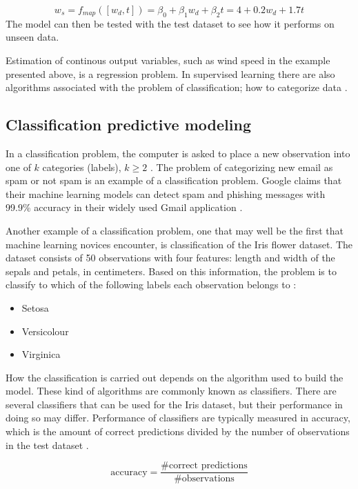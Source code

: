 \begin{equation} \label{eq:example_ws}
	w_s = f_{map}([w_d, t]) = \beta_0 + \beta_1 w_d + \beta_2 t = 4 + 0.2w_d + 1.7t
\end{equation}
	The model can then be tested with the test dataset to see how it performs on unseen data.

	Estimation of continous output variables, such as wind speed in the example presented above, is a regression problem. In supervised learning there are also algorithms associated with the problem of classification; how to categorize data \cite{WEBSITE:8}.


	\subsection{Classification predictive modeling} \label{sec:classification}
	In a classification problem, the computer is asked to place a new observation into one of $k$ categories (labels), $k \geq 2$ \cite{BOOK:1}. The problem of categorizing new email as spam or not spam is an example of a classification problem. Google claims that their machine learning models can detect spam and phishing messages with 99.9\% accuracy in their widely used Gmail application \cite{WEBSITE:4}. 

	Another example of a classification problem, one that may well be the first that machine learning novices encounter, is classification of the Iris flower dataset. The dataset consists of 50 observations with four features: length and width of the sepals and petals, in centimeters. Based on this information, the problem is to classify to which of the following labels each observation belongs to \cite{WEBSITE:5}:

\begin{itemize}
	\item Setosa
	\item Versicolour
	\item Virginica
\end{itemize}

	How the classification is carried out depends on the algorithm used to build the model. These kind of algorithms are commonly known as classifiers. There are several classifiers that can be used for the Iris dataset, but their performance in doing so may differ. Performance of classifiers are typically measured in accuracy, which is the amount of correct predictions divided by the number of observations in the test dataset \cite{BOOK:1}.

\begin{equation}
	\mbox{accuracy} = \frac{\mbox{\#correct predictions}}{\mbox{\#observations}}
\end{equation}
	
